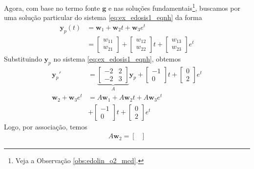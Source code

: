 \begin{ex}
Agora, com base no termo fonte $\pmb{g}$ e nas soluções fundamentais\footnote{Veja a Observação \ref{obs:edolin_o2_mcd}.}, buscamos por uma solução particular do sistema \eqref{eq:ex_edosis1_eqnh} da forma
\begin{align}
  \pmb{y}_p(t) &= \pmb{w}_1 + \pmb{w}_2t + \pmb{w}_3e^{t} \\
               &=
                 \begin{bmatrix}
                   w_{11} \\
                   w_{21}
                 \end{bmatrix} +
  \begin{bmatrix}
    w_{12} \\
    w_{22}
  \end{bmatrix}t +
  \begin{bmatrix}
    w_{13} \\
    w_{23}
  \end{bmatrix}e^{t}
\end{align}
Substituindo $\pmb{y}_p$ no sistema \eqref{eq:ex_edosis1_eqnh}, obtemos
\begin{align}
  \pmb{y}_p' &=
               \underbrace{\begin{bmatrix}
                 -2 & 2 \\
                 -2 & 3
               \end{bmatrix}}_{A}\pmb{y}_p +
                      \begin{bmatrix}
                        -1\\
                        0
                      \end{bmatrix}t +
  \begin{bmatrix}
    0 \\
    2
  \end{bmatrix}e^{t} \\
  \pmb{w}_2 + \pmb{w}_3e^t &= A\pmb{w}_1 + A\pmb{w}_2t + A\pmb{w}_3e^t \\
             &+ \begin{bmatrix}
               -1\\
               0
             \end{bmatrix}t +
  \begin{bmatrix}
    0 \\
    2
  \end{bmatrix}e^{t}
\end{align}
Logo, por associação, temos
\begin{gather}
  A\pmb{w}_2 =
  \begin{bmatrix}

\end{bmatrix}
\end{gather}
\end{ex}
